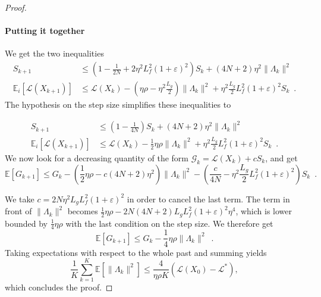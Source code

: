 \documentclass[twoside,11pt]{article}
\begin{document}
\begin{proof}
    \paragraph{Putting it together}
    We get the two inequalities
    \begin{align}
            S_{k+1}&\leq (1 - \frac1{2N} + 2\eta^2L_f^2(1+\varepsilon)^2)S_k + (4N + 2)\eta^2\|\Lambda_k\|^2\\
            \mathbb{E}_i[\mathcal{L}(X_{k+1})]&\leq \mathcal{L}(X_{k}) - (\eta \rho -\eta^2\frac{L_g}2) \| \Lambda_k\|^2+ \eta^2\frac{L_g}2L_f^2(1+\varepsilon)^2S_k \enspace .
    \end{align}
    The hypothesis on the step size simplifies these inequalities to 

    \begin{align}  
S_{k+1}&\leq (1 - \frac1{4N})S_k + (4N + 2)\eta^2\|\Lambda_k\|^2\\
\mathbb{E}_i[\mathcal{L}(X_{k+1})]&\leq \mathcal{L}(X_{k}) - \frac12\eta \rho \| \Lambda_k\|^2+ \eta^2\frac{L_g}2L_f^2(1+\varepsilon)^2S_k\enspace .
    \end{align}
    We now look for a decreasing quantity of the form  $\mathcal{G}_k = \mathcal{L}(X_{k}) + cS_k$, and get
    $$
    \mathbb{E}[G_{k+1}] \leq G_k -(\frac12\eta\rho -c(4N + 2)\eta^2)\|\Lambda_k\|^2 -(\frac c{4N} - \eta^2\frac{L_g}2L_f^2(1+\varepsilon)^2)S_k\enspace.
    $$

    We take $c = 2N \eta^2L_gL_f^2(1+\varepsilon)^2$ in order to cancel the last term. 
    The term in front of $\|\Lambda_k\|^2$ becomes $\frac12\eta\rho - 2N(4N+2)L_gL_f^2(1+\varepsilon)^2\eta^4$, which is lower bounded by $\frac14\eta\rho$ with the last condition on the step size.
    We therefore get
    $$
    \mathbb{E}[G_{k+1}] \leq G_k -\frac14\eta\rho\|\Lambda_k\|^2\enspace.
    $$
    Taking expectations with respect to the whole past and summing yields
    $$
    \frac1K\sum_{k=1}^K\mathbb{E}[\|\Lambda_k\|^2]\leq \frac4{\eta\rho K}(\mathcal{L}(X_0) - \mathcal{L}^*),
    $$
    which concludes the proof.
\end{proof}

%
%
%
%
%
%
%

%
%
%
%

%
%
%
%
%

%

%
%
%
%
%
%
%
%
%
%
%

%

%
%
%

%
%
%
%
%
%
\end{document}
